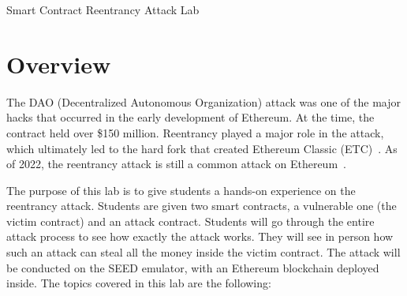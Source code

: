 
\newcommand{\commonfolder}{../../common-files}




\newcommand{\tunnelFigs}{./Figs}


\newcommand{\pointupright}[1]{\ding{218} \textbf{\texttt{#1}}}

\usepackage{hyperref}






\begin{center}
{\LARGE Smart Contract Reentrancy Attack Lab}
\end{center}




\section{Overview} 

The DAO (Decentralized Autonomous Organization) attack was one of the major hacks that
occurred in the early development of Ethereum. At the time, the contract held over \$150
million. Reentrancy played a major role in the attack, which ultimately led to the hard fork
that created Ethereum Classic (ETC)~\cite{MasteringEthereum,DAO}. 
As of 2022, the reentrancy attack is still a common attack on Ethereum~\cite{collection}.


The purpose of this lab is to give students a hands-on experience on
the reentrancy attack. Students are given two smart contracts, 
a vulnerable one (the victim contract) and an attack contract. 
Students will go through the entire attack process
to see how exactly the attack works. They will see in person how such an 
attack can steal all the money inside the victim contract.  The
attack will be conducted on the SEED emulator, with 
an Ethereum blockchain deployed inside. 
The topics covered in this lab are the following:

